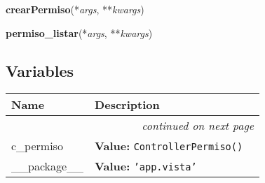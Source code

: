 \hspace{.8\funcindent}\begin{boxedminipage}{\funcwidth}

    \raggedright \textbf{crearPermiso}(*\textit{args}, **\textit{kwargs})

\setlength{\parskip}{2ex}
\setlength{\parskip}{1ex}
    \end{boxedminipage}

    \label{app:vista:vistaPermiso:permiso_listar}

    \vspace{0.5ex}

\hspace{.8\funcindent}\begin{boxedminipage}{\funcwidth}

    \raggedright \textbf{permiso\_listar}(*\textit{args}, **\textit{kwargs})

\setlength{\parskip}{2ex}
\setlength{\parskip}{1ex}
    \end{boxedminipage}



  \subsection{Variables}

    \vspace{-1cm}
\hspace{\varindent}\begin{longtable}{|p{\varnamewidth}|p{\vardescrwidth}|l}
\cline{1-2}
\cline{1-2} \centering \textbf{Name} & \centering \textbf{Description}& \\
\cline{1-2}
\endhead\cline{1-2}\multicolumn{3}{r}{\small\textit{continued on next page}}\\\endfoot\cline{1-2}
\endlastfoot\raggedright c\-\_\-p\-e\-r\-m\-i\-s\-o\- & \raggedright \textbf{Value:} 
{\tt ControllerPermiso()}&\\
\cline{1-2}
\raggedright \_\-\_\-p\-a\-c\-k\-a\-g\-e\-\_\-\_\- & \raggedright \textbf{Value:} 
{\tt \texttt{'}\texttt{app.vista}\texttt{'}}&\\
\cline{1-2}
\end{longtable}


